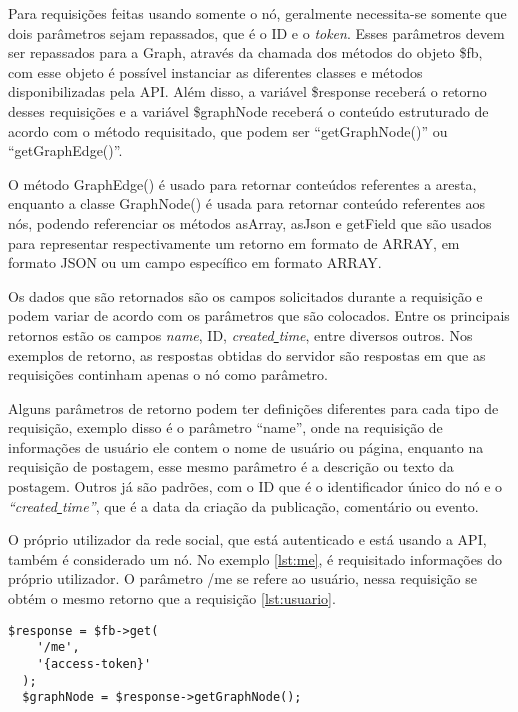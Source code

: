 Para requisições feitas usando somente o nó, geralmente necessita-se somente que dois parâmetros sejam repassados, que é o ID e o \textit{token}. Esses parâmetros devem ser repassados para a Graph, através da chamada dos métodos do objeto \$fb, com esse objeto é possível instanciar as diferentes classes e métodos disponibilizadas pela API. Além disso, a variável \$response receberá o retorno desses requisições e a variável \$graphNode receberá o conteúdo estruturado de acordo com o método requisitado, que podem ser ``getGraphNode()'' ou ``getGraphEdge()''.

O método GraphEdge() é usado para retornar conteúdos referentes a aresta, enquanto a classe GraphNode() é usada para retornar conteúdo referentes aos nós, podendo referenciar os métodos asArray, asJson e getField que são usados para representar respectivamente um retorno em formato de ARRAY, em formato JSON ou um campo específico em formato ARRAY.

Os dados que são retornados são os campos solicitados durante a requisição e podem variar de acordo com os parâmetros que são colocados. Entre os principais retornos estão os campos \textit{name}, ID, \textit{created\underline{{ }}time}, entre diversos outros. Nos exemplos de retorno, as respostas obtidas do servidor são respostas em que as requisições continham apenas o nó como parâmetro.  

Alguns parâmetros de retorno podem ter definições diferentes para cada tipo de requisição, exemplo disso é o parâmetro ``name'', onde na requisição de informações de usuário ele contem o nome de usuário ou página, enquanto na requisição de postagem, esse mesmo parâmetro é a descrição ou texto da postagem. Outros já são padrões, com o ID que é o identificador único do nó e o \textit{``created\underline{{ }}time''}, que é a data da criação da publicação, comentário ou evento.

O próprio utilizador da rede social, que está autenticado e está usando a API, também é considerado um nó. No exemplo \ref{lst:me}, é requisitado informações do próprio utilizador. O parâmetro /me se refere ao usuário, nessa requisição se obtém o mesmo retorno que a requisição \ref{lst:usuario}.

\begin{lstlisting}[caption={Requisitar informações do próprio usuário},label={lst:me}]
  $response = $fb->get(
    '/me',
    '{access-token}'
  );
  $graphNode = $response->getGraphNode();
\end{lstlisting}


